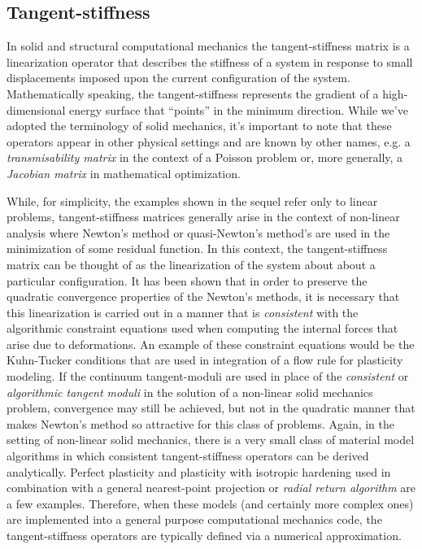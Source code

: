 \documentclass[preprint,12pt]{elsarticle}
\begin{document}
\subsection{Tangent-stiffness} 

In solid and structural computational mechanics the tangent-stiffness matrix is a linearization operator that describes the stiffness of a system in response to small displacements imposed upon the current configuration of the system.  Mathematically speaking, the tangent-stiffness represents the gradient of a high-dimensional energy surface that ``points'' in the minimum direction. While we've adopted the terminology of solid mechanics, it's important to note that these operators appear in other physical settings and are known by other names, e.g. a \emph{transmisability matrix} in the context of a Poisson problem or, more generally, a \emph{Jacobian matrix} in mathematical optimization.

While, for simplicity, the examples shown in the sequel refer only to linear problems, tangent-stiffness matrices generally arise in the context of non-linear analysis where Newton's method or quasi-Newton's method's are used in the minimization of some residual function.  In this context, the tangent-stiffness matrix can be thought of as the linearization of the system about about a particular configuration.  It has been shown \cite{hughes1978consistent, hughes1978unconditionally} that in order to preserve the quadratic convergence properties of the Newton's methods, it is necessary that this linearization is carried out in a manner that is \emph{consistent} with the algorithmic constraint equations used when computing the internal forces that arise due to deformations.  An example of these constraint equations would be the Kuhn-Tucker conditions \cite{simo1998} that are used in integration of a flow rule for plasticity modeling.  If the continuum tangent-moduli are used in place of the \emph{consistent} or \emph{algorithmic tangent moduli} in the solution of a non-linear solid mechanics problem, convergence may still be achieved, but not in the quadratic manner that makes Newton's method so attractive for this class of problems.  Again, in the setting of non-linear solid mechanics, there is a very small class of material model algorithms in which consistent tangent-stiffness operators can be derived analytically.  Perfect plasticity and plasticity with isotropic hardening used in combination with a general nearest-point projection or \emph{radial return algorithm} are a few examples.  Therefore, when these models (and certainly more complex ones) are implemented into a general purpose computational mechanics code, the tangent-stiffness operators are typically defined via a numerical approximation.
\end{document}
